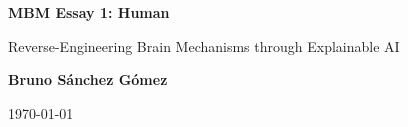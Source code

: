 \documentclass[11pt,a4paper]{article}
\author{Bruno Sánchez Gómez}
\date{\today}
\begin{document}
\begin{titlepage}
    \centering
    \vspace*{2cm}
    {\Huge \bfseries MBM Essay 1: Human \par}
    \vspace{2cm}
    {\Large {\Huge Reverse-Engineering Brain Mechanisms through Explainable AI} \par}
    \vspace{8cm}
    {\large \textbf{Bruno Sánchez Gómez} \par}
    \vfill
    {\large \today \par}
\end{titlepage}





\nocite{*}
\printbibliography%
\end{document}
